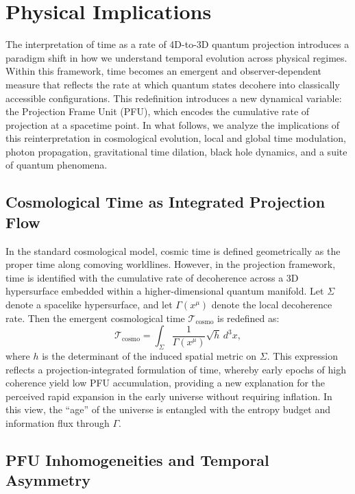 \documentclass[12pt,a4paper]{article}
\numberwithin{equation}{section}
\begin{document}
\section{Physical Implications}
\label{sec:implications}

The interpretation of time as a rate of 4D-to-3D quantum projection introduces a paradigm shift in how we understand temporal evolution across physical regimes. Within this framework, time becomes an emergent and observer-dependent measure that reflects the rate at which quantum states decohere into classically accessible configurations. This redefinition introduces a new dynamical variable: the Projection Frame Unit (PFU), which encodes the cumulative rate of projection at a spacetime point. In what follows, we analyze the implications of this reinterpretation in cosmological evolution, local and global time modulation, photon propagation, gravitational time dilation, black hole dynamics, and a suite of quantum phenomena.

\subsection{Cosmological Time as Integrated Projection Flow}

In the standard cosmological model, cosmic time is defined geometrically as the proper time along comoving worldlines. However, in the projection framework, time is identified with the cumulative rate of decoherence across a 3D hypersurface embedded within a higher-dimensional quantum manifold. Let $\Sigma$ denote a spacelike hypersurface, and let $\Gamma(x^\mu)$ denote the local decoherence rate. Then the emergent cosmological time $\mathcal{T}_{\text{cosmo}}$ is redefined as:
\begin{equation}
\label{eq:cosmic_pfu}
\mathcal{T}_{\text{cosmo}} = \int_{\Sigma} \frac{1}{\Gamma(x^\mu)} \sqrt{h} \, d^3x,
\end{equation}
where $h$ is the determinant of the induced spatial metric on $\Sigma$. This expression reflects a projection-integrated formulation of time, whereby early epochs of high coherence yield low PFU accumulation, providing a new explanation for the perceived rapid expansion in the early universe without requiring inflation. In this view, the “age” of the universe is entangled with the entropy budget and information flux through $\Gamma$.

\subsection{PFU Inhomogeneities and Temporal Asymmetry}
\end{document}
